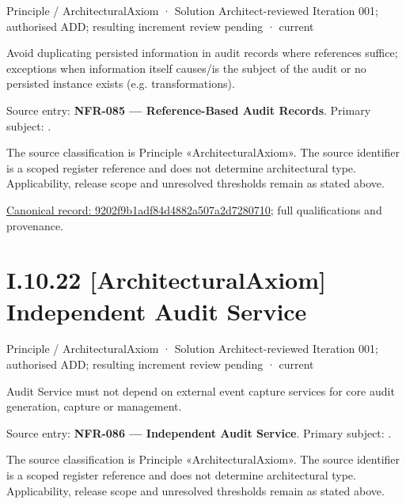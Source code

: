 \label{element:9202f9b1adf84d4882a507a2d7280710}
{\small Principle / ArchitecturalAxiom · Solution Architect-reviewed Iteration 001; authorised ADD; resulting increment review pending · current}\par

Avoid duplicating persisted information in audit records where references suffice; exceptions when information itself causes/is the subject of the audit or no persisted instance exists (e.g. transformations).



Source entry: \textbf{NFR-085 — Reference-Based Audit Records}. Primary subject: \texttt{}.



The source classification is Principle «ArchitecturalAxiom». The source identifier is a scoped register reference and does not determine architectural type. Applicability, release scope and unresolved thresholds remain as stated above.


{\footnotesize \href{../../../../../../../../continuum/motivation/principle/architectural-axiom/9202f9b1adf84d4882a507a2d7280710.md}{Canonical record: 9202f9b1adf84d4882a507a2d7280710}; full qualifications and provenance.}\par
\section*{I.10.22 [ArchitecturalAxiom] Independent Audit Service}
\label{navigation:I.10.22}

\label{element:41fa01556ade4f22a35288b072113767}
{\small Principle / ArchitecturalAxiom · Solution Architect-reviewed Iteration 001; authorised ADD; resulting increment review pending · current}\par

Audit Service must not depend on external event capture services for core audit generation, capture or management.



Source entry: \textbf{NFR-086 — Independent Audit Service}. Primary subject: \texttt{}.



The source classification is Principle «ArchitecturalAxiom». The source identifier is a scoped register reference and does not determine architectural type. Applicability, release scope and unresolved thresholds remain as stated above.


